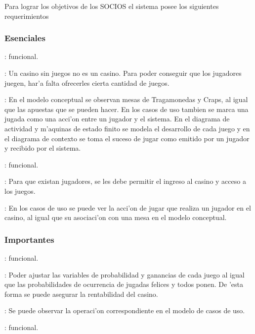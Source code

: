 Para lograr los objetivos de los SOCIOS el sistema posee los siguientes requerimientos

\subsubsection{Esenciales}
: funcional. 

: Un casino sin juegos no es un casino. Para poder conseguir que los jugadores juegen, har'a falta ofrecerles cierta cantidad de juegos.

: En el modelo conceptual se observan mesas de Tragamonedas y Craps, al igual que las apuestas que se pueden hacer. En los casos de uso tambien se marca una jugada como una acci'on entre un jugador y el sistema. En el diagrama de actividad y m'aquinas de estado finito se modela el desarrollo de cada juego y en el diagrama de contexto se toma el suceso de jugar como emitido por un jugador y recibido por el sistema. 



: funcional.

: Para que existan jugadores, se les debe permitir el ingreso al casino y acceso a los juegos.

: En los casos de uso se puede ver la acci'on de jugar que realiza un jugador en el casino, al igual que su asociaci'on con una mesa en el modelo conceptual.





\subsubsection{Importantes}

: funcional.

: Poder ajustar las variables de probabilidad y ganancias de cada juego al igual que las probabilidades de ocurrencia de jugadas felices y todos ponen. De 'esta forma se puede asegurar la rentabilidad del casino.

: Se puede observar la operaci'on correspondiente en el modelo de casos de uso.
	
	
	
: funcional.


